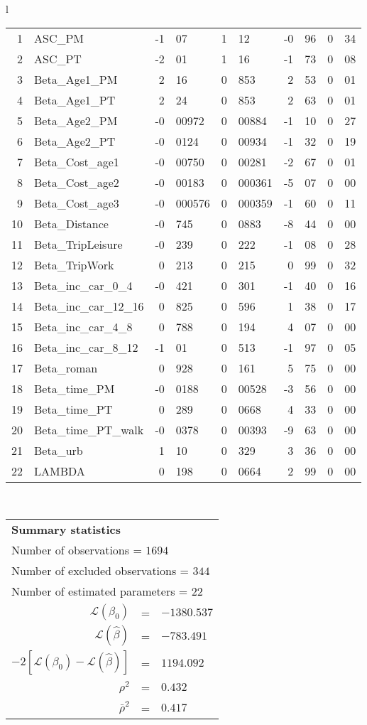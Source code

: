 \begin{tabular}{l}
\begin{tabular}{rlr@{.}lr@{.}lr@{.}lr@{.}l}
1 & ASC_PM  & -1&07 & 1&12 & -0&96 & 0&34\\
2 & ASC_PT & -2&01 & 1&16 & -1&73 & 0&08\\
3 & Beta_Age1_PM & 2&16 & 0&853 & 2&53 & 0&01\\
4 & Beta_Age1_PT & 2&24 & 0&853 & 2&63 & 0&01\\
5 & Beta_Age2_PM & -0&00972 & 0&00884 & -1&10 & 0&27\\
6 & Beta_Age2_PT & -0&0124 & 0&00934 & -1&32 & 0&19\\
7 & Beta_Cost_age1 & -0&00750 & 0&00281 & -2&67 & 0&01\\
8 & Beta_Cost_age2 & -0&00183 & 0&000361 & -5&07 & 0&00\\
9 & Beta_Cost_age3 & -0&000576 & 0&000359 & -1&60 & 0&11\\
10 & Beta_Distance & -0&745 & 0&0883 & -8&44 & 0&00\\
11 & Beta_TripLeisure & -0&239 & 0&222 & -1&08 & 0&28\\
12 & Beta_TripWork & 0&213 & 0&215 & 0&99 & 0&32\\
13 & Beta_inc_car_0_4 & -0&421 & 0&301 & -1&40 & 0&16\\
14 & Beta_inc_car_12_16 & 0&825 & 0&596 & 1&38 & 0&17\\
15 & Beta_inc_car_4_8 & 0&788 & 0&194 & 4&07 & 0&00\\
16 & Beta_inc_car_8_12 & -1&01 & 0&513 & -1&97 & 0&05\\
17 & Beta_roman & 0&928 & 0&161 & 5&75 & 0&00\\
18 & Beta_time_PM & -0&0188 & 0&00528 & -3&56 & 0&00\\
19 & Beta_time_PT & 0&289 & 0&0668 & 4&33 & 0&00\\
20 & Beta_time_PT_walk & -0&0378 & 0&00393 & -9&63 & 0&00\\
21 & Beta_urb & 1&10 & 0&329 & 3&36 & 0&00\\
22 & LAMBDA & 0&198 & 0&0664 & 2&99 & 0&00\\
\hline
\end{tabular}
\\
\begin{tabular}{rcl}
\multicolumn{3}{l}{\bf Summary statistics}\\
\multicolumn{3}{l}{ Number of observations = $1694$} \\
\multicolumn{3}{l}{ Number of excluded observations = $344$} \\
\multicolumn{3}{l}{ Number of estimated  parameters = $22$} \\
 $\mathcal{L}(\beta_0)$ &=&  $-1380.537$ \\
 $\mathcal{L}(\hat{\beta})$ &=& $-783.491 $  \\
 $-2[\mathcal{L}(\beta_0) -\mathcal{L}(\hat{\beta})]$ &=& $1194.092$ \\
    $\rho^2$ &=&   $0.432$ \\
    $\bar{\rho}^2$ &=&    $0.417$ \\
\end{tabular}
  \end{tabular}
